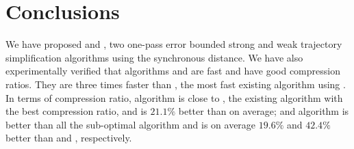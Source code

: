 \vspace{-1ex}
\section{Conclusions}  %
\label{sec-conclusion}

We have proposed \cist and \cista, two one-pass error bounded strong and weak trajectory simplification algorithms using the synchronous distance.
We have also experimentally verified that algorithms \cist and \cista are fast and have good compression ratios.
They are three times faster than \squishe, the most fast existing \lsa algorithm using \sed.
%
In terms of compression ratio,
algorithm \cist is close to \dps, the existing \lsa algorithm with the best compression ratio, and is $21.1\%$ better than \squishe on average; and algorithm \cista is better than all the sub-optimal algorithm and is on average $19.6\%$ and $42.4\%$ better than \dps and \squishe, respectively.

